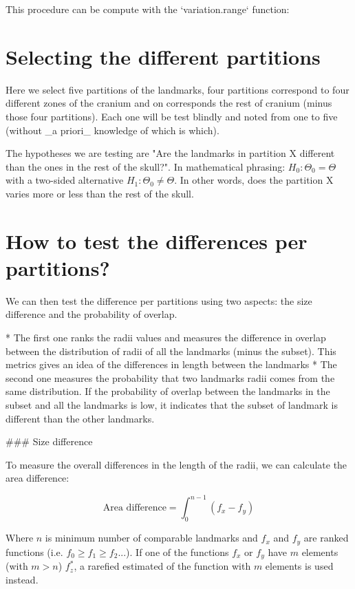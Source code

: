 \documentclass[a4paper,11pt]{article}
\begin{document}
This procedure can be compute with the `variation.range` function:


\section{Selecting the different partitions}

Here we select five partitions of the landmarks, four partitions correspond to four different zones of the cranium and on corresponds the rest of cranium (minus those four partitions).
Each one will be test blindly and noted from one to five (without _a priori_ knowledge of which is which).


The hypotheses we are testing are "Are the landmarks in partition X different than the ones in the rest of the skull?".
In mathematical phrasing: $H_{0}: \Theta_{0} = \Theta$ with a two-sided alternative $H_{1}: \Theta_{0} \neq \Theta$.
In other words, does the partition X varies more or less than the rest of the skull.


\section{How to test the differences per partitions?}

We can then test the difference per partitions using two aspects: the size difference and the probability of overlap.

 * The first one ranks the radii values and measures the difference in overlap between the distribution of radii of all the landmarks (minus the subset).
 This metrics gives an idea of the differences in length between the landmarks
 * The second one measures the probability that two landmarks radii comes from the same distribution.
 If the probability of overlap between the landmarks in the subset and all the landmarks is low, it indicates that the subset of landmark is different than the other landmarks.

### Size difference

To measure the overall differences in the length of the radii, we can calculate the area difference:

\begin{equation}
    \text{Area difference} = \int_{0}^{n-1} (f_{x} - f_{y})
\end{equation}

Where $n$ is minimum number of comparable landmarks and $f_{x}$ and $f_{y}$ are ranked functions (i.e. $f_{0} \geq f_{1} \geq f_{2} ...$).
If one of the functions $f_{x}$ or $f_{y}$ have $m$ elements (with $m > n$) $f^{*}_{z}$, a rarefied estimated of the function with $m$ elements is used instead.
\end{document}
